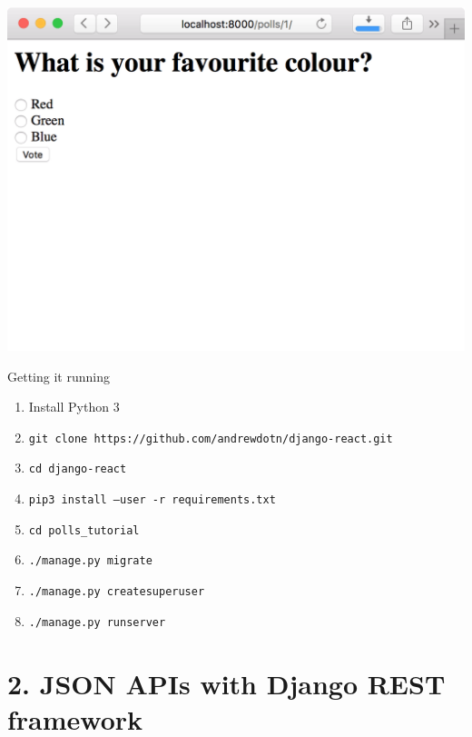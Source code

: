 \documentclass[xcolor=svgnames,17pt]{beamer}
\newcommand*{\sizefont}[1]{%
    \ifcase#1\relax
    \or \tiny
    \or \scriptsize
    \or \footnotesize
    \or \small
    \or \normalsize
    \or \large
    \or \Large
    \or \LARGE
    \or \huge
    \or \Huge
    \fi}
\begin{document}
\begin{frame}[plain]
\includegraphics[width=0.95\paperwidth,center]{polls3.png}
\end{frame}
\endgroup

\begin{frame}{Getting it running}

\sizefont{3}

\begin{enumerate}
\item Install Python 3
\item \texttt{git clone https://github.com/andrewdotn/django-react.git}
\item \texttt{cd django-react}
\item \texttt{pip3 install --user -r requirements.txt}
\item \texttt{cd polls\_tutorial}
\item \texttt{./manage.py migrate}
\item \texttt{./manage.py createsuperuser}
\item \texttt{./manage.py runserver}
\end{enumerate}
\end{frame}

\section{2. JSON APIs with Django REST framework}

\begin{frame}{}
\tableofcontents[currentsection]
\end{frame}
\end{document}
